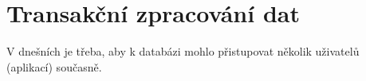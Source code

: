 \section{Transakční zpracování dat}
V dnešních  je třeba, aby k databázi mohlo přistupovat několik uživatelů (aplikací) současně. 